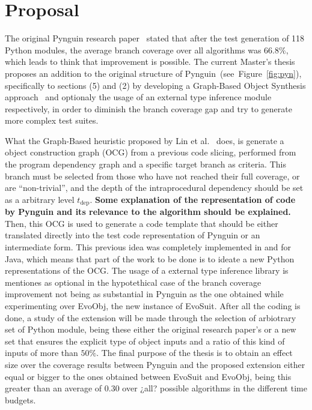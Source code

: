 \documentclass[%
  chapterprefix=false,%
  open=right,%
  twoside=true,%
  paper=a4,%
  logofile={Figures/logo.png},%
  thesistype=master,%
  UKenglish,%
]{se2thesis}
\begin{document}
\fi


\chapter{Proposal}

The original Pynguin research paper~\cite{DBLP:conf/icse/LukasczykF22} stated that after the test generation of 118 Python modules, the average branch coverage over all algorithms was $66.8\%$, which leads to think that improvement is possible.
The current Master's thesis proposes an addition to the original structure of Pynguin~(see~Figure~\ref{fig:pyn}), specifically to sections (5) and (2) by developing
a Graph-Based Object Synthesis approach~\cite{DBLP:conf/sigsoft/0001O00D21} and optionaly the usage of an external type inference module respectively, in order to diminish the branch coverage gap and try to generate more complex test suites.

What the Graph-Based heuristic proposed by Lin et al.~\cite{DBLP:conf/sigsoft/0001O00D21} does, is generate a object construction graph (OCG) from a previous code slicing, performed from the program dependency graph and a specific target branch as criteria.
This branch must be selected from those who have not reached their full coverage, or are ``non-trivial'', and the depth of the intraprocedural dependency should be set as a arbitrary level $t_{\text{dep}}$.
\textbf{Some explanation of the representation of code by Pynguin and its relevance to the algorithm should be explained.}
Then, this OCG is used to generate a code template that should be either translated directly into the test code representation of Pynguin or an intermediate form.
This previous idea was completely implemented in and for Java, which means that part of the work to be done is to ideate a new Python representations of the OCG.\@
The usage of a external type inference library is mentiones as optional in the hypotethical case of the branch coverage improvement not being as substantial in Pynguin as the one obtained while experimenting over EvoObj, the new instance of EvoSuit.
After all the coding is done, a study of the extension will be made through the selection of arbiotrary set of Python module, being these either the original research paper's or a new set that ensures the explicit type of object inputs and a ratio of this kind of inputs of more than $50\%$.
The final purpose of the thesis is to obtain an effect size over the coverage results between Pynguin and the proposed extension either equal or bigger to the ones obtained between EvoSuit and EvoObj, being this greater than an average of $0.30$ over ¿all? possible algorithms in the different time budgets.
\end{document}
